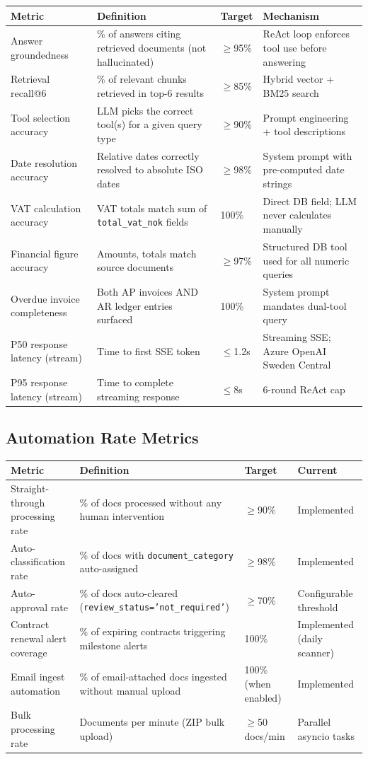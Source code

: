 \documentclass[12pt,a4paper]{article}
\newcommand{\codeinline}[1]{\texttt{\small\color{NordicBlue}#1}}
\begin{document}
\begin{tabularx}{\textwidth}{lXll}
\toprule
\textbf{Metric} & \textbf{Definition} & \textbf{Target} & \textbf{Mechanism} \\
\midrule
Answer groundedness & \% of answers citing retrieved documents (not hallucinated) & $\geq$95\% & ReAct loop enforces tool use before answering \\
Retrieval recall@6 & \% of relevant chunks retrieved in top-6 results & $\geq$85\% & Hybrid vector + BM25 search \\
Tool selection accuracy & LLM picks the correct tool(s) for a given query type & $\geq$90\% & Prompt engineering + tool descriptions \\
Date resolution accuracy & Relative dates correctly resolved to absolute ISO dates & $\geq$98\% & System prompt with pre-computed date strings \\
VAT calculation accuracy & VAT totals match sum of \codeinline{total\_vat\_nok} fields & 100\% & Direct DB field; LLM never calculates manually \\
Financial figure accuracy & Amounts, totals match source documents & $\geq$97\% & Structured DB tool used for all numeric queries \\
Overdue invoice completeness & Both AP invoices AND AR ledger entries surfaced & 100\% & System prompt mandates dual-tool query \\
P50 response latency (stream) & Time to first SSE token & $\leq$1.2s & Streaming SSE; Azure OpenAI Sweden Central \\
P95 response latency (stream) & Time to complete streaming response & $\leq$8s & 6-round ReAct cap \\
\bottomrule
\end{tabularx}

\subsection{Automation Rate Metrics}

\begin{tabularx}{\textwidth}{lXll}
\toprule
\textbf{Metric} & \textbf{Definition} & \textbf{Target} & \textbf{Current} \\
\midrule
Straight-through processing rate & \% of docs processed without any human intervention & $\geq$90\% & Implemented \\
Auto-classification rate & \% of docs with \codeinline{document\_category} auto-assigned & $\geq$98\% & Implemented \\
Auto-approval rate & \% of docs auto-cleared (\codeinline{review\_status='not\_required'}) & $\geq$70\% & Configurable threshold \\
Contract renewal alert coverage & \% of expiring contracts triggering milestone alerts & 100\% & Implemented (daily scanner) \\
Email ingest automation & \% of email-attached docs ingested without manual upload & 100\% (when enabled) & Implemented \\
Bulk processing rate & Documents per minute (ZIP bulk upload) & $\geq$50 docs/min & Parallel asyncio tasks \\
\bottomrule
\end{tabularx}
\end{document}
